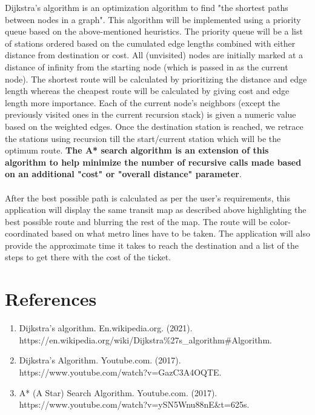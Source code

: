 \documentclass[fontsize=11pt]{article}
\begin{document}
Dijkstra's algorithm is an optimization algorithm to find "the shortest paths between nodes in a graph". This algorithm will be implemented using a priority queue based on the above-mentioned heuristics. The priority queue will be a list of stations ordered based on the cumulated edge lengths combined with either distance from destination or cost. All (unvisited) nodes are initially marked at a distance of infinity from the starting node (which is passed in as the current node). The shortest route will be calculated by prioritizing the distance and edge length whereas the cheapest route will be calculated by giving cost and edge length more importance. Each of the current node's neighbors (except the previously visited ones in the current recursion stack) is given a numeric value based on the weighted edges. Once the destination station is reached, we retrace the stations using recursion till the start/current station which will be the optimum route. \textbf{The A* search algorithm is an extension of this algorithm to help minimize the number of recursive calls made based on an additional "cost" or "overall distance" parameter}.\\
\\
After the best possible path is calculated as per the user's requirements, this application will display the same transit map as described above highlighting the best possible route and blurring the rest of the map. The route will be color-coordinated based on what metro lines have to be taken. The application will also provide the approximate time it takes to reach the destination and a list of the steps to get there with the cost of the ticket.
\section*{References}
\begin{enumerate}
    \item Dijkstra's algorithm. En.wikipedia.org. (2021). https://en.wikipedia.org/wiki/Dijkstra\%27s\_algorithm\#Algorithm.
    \item Dijkstra's Algorithm. Youtube.com. (2017). https://www.youtube.com/watch?v=GazC3A4OQTE.
    \item A* (A Star) Search Algorithm. Youtube.com. (2017). https://www.youtube.com/watch?v=ySN5Wnu88nE\&t=625s.
\end{enumerate}


\end{document}
